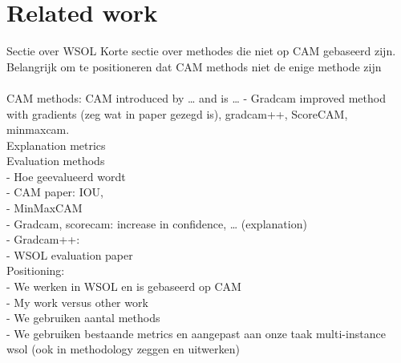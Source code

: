 \chapter{Related work} \label{ch:related_work}

Sectie over WSOL
Korte sectie over methodes die niet op CAM gebaseerd zijn. Belangrijk om te positioneren dat CAM methods niet de enige methode zijn \\\\
CAM methods: CAM introduced by … and is … 
- Gradcam improved method with gradients (zeg wat in paper gezegd is), gradcam++, ScoreCAM, minmaxcam. 
\\
Explanation metrics \\
Evaluation methods \\
- Hoe geevalueerd wordt \\
- CAM paper: IOU,\\
- MinMaxCAM\\
- Gradcam, scorecam: increase in confidence, … (explanation) \\
- Gradcam++: \\
- WSOL evaluation paper\\
Positioning:\\
- We werken in WSOL en is gebaseerd op CAM\\
- My work versus other work\\
- We gebruiken aantal methods\\
- We gebruiken bestaande metrics en aangepast aan onze taak multi-instance wsol (ook in methodology zeggen en uitwerken)\\




